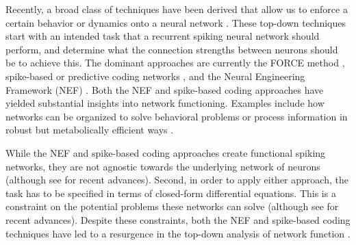 \documentclass[11pt]{article} %
\begin{document}
% 
  Recently, a broad class of techniques have been derived that allow us to enforce a certain behavior or dynamics onto a neural network \cite{FORCE1,FORCE2,FORCE3,FORCE4,Deneve1,Deneve2,Deneve4,Chris1,Chris2,Gilra}.  These top-down techniques start with an intended task that a recurrent spiking neural network should perform, and determine what the connection strengths between neurons should be to achieve this.   The dominant approaches are currently the FORCE method \cite{FORCE1,FORCE2},  spike-based or predictive coding networks \cite{Deneve1,Deneve2,Deneve4}, and the Neural Engineering Framework (NEF) \cite{Chris1,Chris2}.  Both the NEF and spike-based coding approaches have yielded substantial insights into network functioning.  Examples include how networks can be organized to solve behavioral problems \cite{Chris1} or process information in robust but metabolically efficient ways \cite{Deneve1,Deneve2}.  

  While the NEF and spike-based coding approaches create functional spiking networks, they are not agnostic towards the underlying network of neurons (although see \cite{Deneve2,Ali,Brendel} for recent advances).   Second, in order to apply either approach, the task has to be specified in terms of closed-form differential equations.  This is a constraint on the potential problems these networks can solve (although see \cite{Ben,Deneve4} for  recent advances).    Despite these constraints, both the NEF and spike-based coding techniques have led to a resurgence in the top-down analysis of network function \cite{FORCE3}.  

\end{document}
